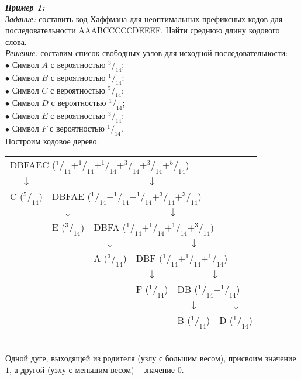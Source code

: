\emph{\textbf{Пример 1:}}
\\\emph{Задание:} составить код Хаффмана для неоптимальных префиксных кодов для последовательности AAABCCCCCDEEEF. Найти среднюю длину кодового слова.
\\\emph{Решение:} составим список свободных узлов для исходной последовательности:
\\$\bullet$ Символ $A$ с вероятностью $^3/_{14}$;
\\$\bullet$ Символ $B$ с вероятностью $^1/_{14}$;
\\$\bullet$ Символ $C$ с вероятностью $^5/_{14}$;
\\$\bullet$ Символ $D$ с вероятностью $^1/_{14}$;
\\$\bullet$ Символ $E$ с вероятностью $^3/_{14}$;
\\$\bullet$ Символ $F$ с вероятностью $^1/_{14}$.
\\Построим кодовое дерево:
\begin{table}[h]
\centering
\begin{tabular}{c c c c c c}
\multicolumn{6}{l}{DBFAEC ($^1/_{14} + ^1/_{14} + ^1/_{14} + ^3/_{14} + ^3/_{14} + ^5/_{14}$)} \\
$\downarrow$ & \multicolumn{5}{c}{$\downarrow$} \\
C ($^5/_{14}$) & \multicolumn{5}{l}{DBFAE ($^1/_{14} + ^1/_{14} + ^1/_{14} + ^3/_{14} + ^3/_{14}$)} \\
& $\downarrow$ & \multicolumn{4}{c}{$\downarrow$} \\
& E ($^3/_{14}$) & \multicolumn{4}{l}{DBFA ($^1/_{14} + ^1/_{14} + ^1/_{14} + ^3/_{14}$)} \\
& & $\downarrow$ & \multicolumn{3}{c}{$\downarrow$} \\
& & A ($^3/_{14}$) & \multicolumn{3}{l}{DBF ($^1/_{14} + ^1/_{14} + ^1/_{14}$)} \\
& & & $\downarrow$ & \multicolumn{2}{c}{$\downarrow$} \\
& & & F ($^1/_{14}$) & \multicolumn{2}{l}{DB ($^1/_{14} + ^1/_{14}$)} \\
& & & & $\downarrow$ & $\downarrow$ \\
& & & & B ($^1/_{14}$) & D ($^1/_{14}$) \\
\end{tabular}
\end{table}
\\Одной дуге, выходящей из родителя (узлу с большим весом), присвоим значение $1$, а другой (узлу с меньшим весом) -- значение $0$.
